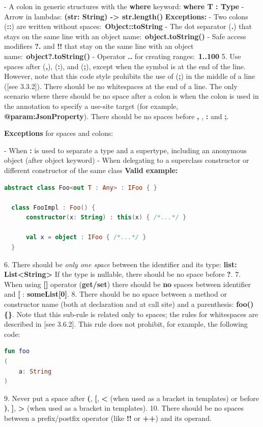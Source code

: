  - A colon in generic structures with the \textbf{where} keyword:  \textbf{where T : Type}
 - Arrow in lambdas: \textbf{(str: String) -> str.length()}
\textbf{Exceptions:}
- Two colons (\textbf{::}) are written without spaces:\
  \textbf{Object::toString}
- The dot separator (\textbf{.}) that stays on the same line with an object name:\
  \textbf{object.toString()}
- Safe access modifiers \textbf{?.} and \textbf{!!} that stay on the same line with an object name:\
  \textbf{object?.toString()}
- Operator \textbf{..} for creating ranges:\
  \textbf{1..100}
5.  Use spaces after (\textbf{,}), (\textbf{:}), and (\textbf{;}), except when the symbol is at the end of the line.
    However, note that this code style prohibits the use of (\textbf{;}) in the middle of a line ([see 3.3.2]).
    There should be no whitespaces at the end of a line.
    The only scenario where there should be no space after a colon is when the colon is used in the annotation to specify a use-site target (for example, \textbf{@param:JsonProperty}).
    There should be no spaces before \textbf{,} , \textbf{:} and \textbf{;}. 
    
    \textbf{Exceptions} for spaces and colons:
    
    - When \textbf{:} is used to separate a type and a supertype, including an anonymous object (after object keyword)
    - When delegating to a superclass constructor or different constructor of the same class
\textbf{Valid example:}
\begin{lstlisting}[language=Kotlin]
  abstract class Foo<out T : Any> : IFoo { }
  
  class FooImpl : Foo() {
      constructor(x: String) : this(x) { /*...*/ }
      
      val x = object : IFoo { /*...*/ } 
  }
\end{lstlisting}
6. There should be \textit{only one space} between the identifier and its type: \textbf{list: List<String>}
If the type is nullable, there should be no space before \textbf{?}.
7. When using \textbf{[]} operator (\textbf{get/set}) there should be \textbf{no} spaces between identifier and \textbf{[} : \textbf{someList[0]}.
8. There should be no space between a method or constructor name (both at declaration and at call site) and a parenthesis:
   \textbf{foo() \{\}}. Note that this sub-rule is related only to spaces; the rules for whitespaces are described in [see 3.6.2].
    This rule does not prohibit, for example, the following code:
\begin{lstlisting}[language=Kotlin]
fun foo
(
    a: String
)
\end{lstlisting}
9. Never put a space after \textbf{(}, \textbf{[}, \textbf{<} (when used as a bracket in templates) or before \textbf{)}, \textbf{]}, \textbf{>} (when used as a bracket in templates).
10. There should be no spaces between a prefix/postfix operator (like \textbf{!!} or \textbf{++}) and its operand.

